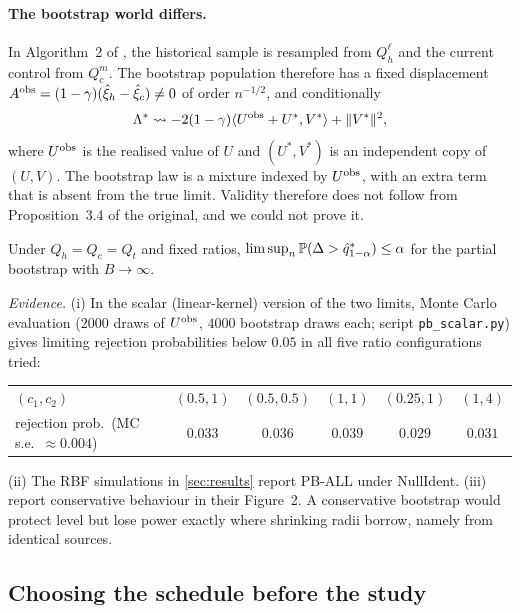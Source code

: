 \documentclass[11pt,a4paper]{article}
\begin{document}
\paragraph{The bootstrap world differs.} In Algorithm~2 of \citet{yang2026}, the historical sample is resampled from $Q_h^\ell$ and the current control from $Q_c^m$. The bootstrap population therefore has a fixed displacement $A^{\rm obs}=(1-\gamma)(\hxi_h-\hxi_c)\neq0$ of order $n^{-1/2}$, and conditionally
\[
\Lambda^\ast\rightsquigarrow-2(1-\gamma)\ip{U^{\rm obs}+U^\ast}{V^\ast}+\norm{V^\ast}^2,
\]
where $U^{\rm obs}$ is the realised value of $U$ and $(U^\ast,V^\ast)$ is an independent copy of $(U,V)$. The bootstrap law is a mixture indexed by $U^{\rm obs}$, with an extra term that is absent from the true limit. Validity therefore does not follow from Proposition~3.4 of the original, and we could not prove it.

\begin{conjecture}\label{conj:pb}
Under $Q_h=Q_c=Q_t$ and fixed ratios, $\limsup_n\P(\Delta>\hat q^{\ast}_{1-\alpha})\le\alpha$ for the partial bootstrap with $B\to\infty$.
\end{conjecture}

\textit{Evidence.} (i) In the scalar (linear-kernel) version of the two limits, Monte Carlo evaluation ($2000$ draws of $U^{\rm obs}$, $4000$ bootstrap draws each; script \texttt{pb\_scalar.py}) gives limiting rejection probabilities below $0.05$ in all five ratio configurations tried:
\begin{center}\small
\begin{tabular}{@{}lccccc@{}}
\toprule
$(c_1,c_2)$ & $(0.5,1)$ & $(0.5,0.5)$ & $(1,1)$ & $(0.25,1)$ & $(1,4)$\\
rejection prob.\ (MC s.e.\ $\approx0.004$) & $0.033$ & $0.036$ & $0.039$ & $0.029$ & $0.031$\\
\bottomrule
\end{tabular}
\end{center} (ii) The RBF simulations in \cref{sec:results} report PB-ALL under NullIdent. (iii) \citet{yang2026} report conservative behaviour in their Figure~2. A conservative bootstrap would protect level but lose power exactly where shrinking radii borrow, namely from identical sources.

\subsection{Choosing the schedule before the study}\label{sec:planning}
\end{document}

